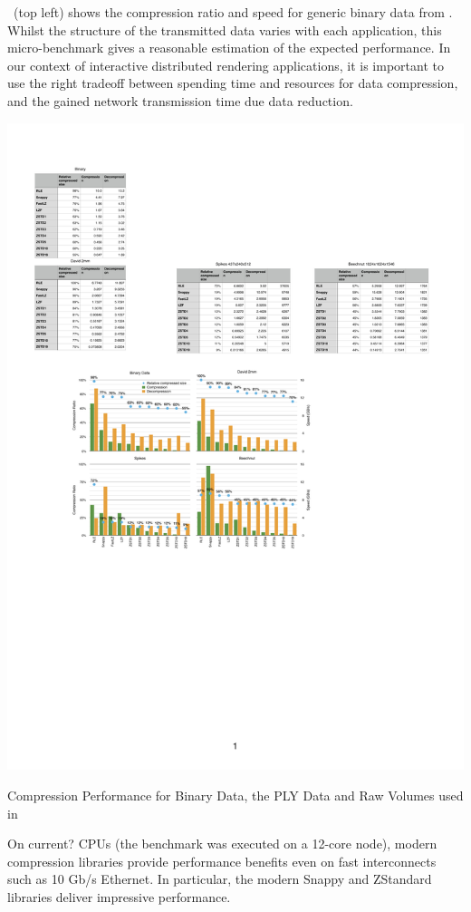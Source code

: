 ~(top left) shows the compression ratio and speed for
generic binary data from \cite{ESP:18}. Whilst the structure of the transmitted
data varies with each application, this micro-bench\-mark gives a reasonable
estimation of the expected performance. In our context of interactive
distributed rendering applications, it is important to use the right tradeoff
between spending time and resources for data compression, and the gained
network transmission time due data reduction.

\begin{benchmark}[h!t]\center
  \includegraphics[width=\textwidth]{results/compressorDetail}
  \caption{\label{rCompressorDetail}Compression Performance for Binary Data, the PLY Data and Raw Volumes used in }
\end{benchmark}

On current? CPUs (the benchmark was executed on a 12-core node), modern
compression libraries provide performance benefits even on fast interconnects
such as 10 Gb/s Ethernet. In particular, the modern Snappy and ZStandard
libraries deliver impressive performance.

